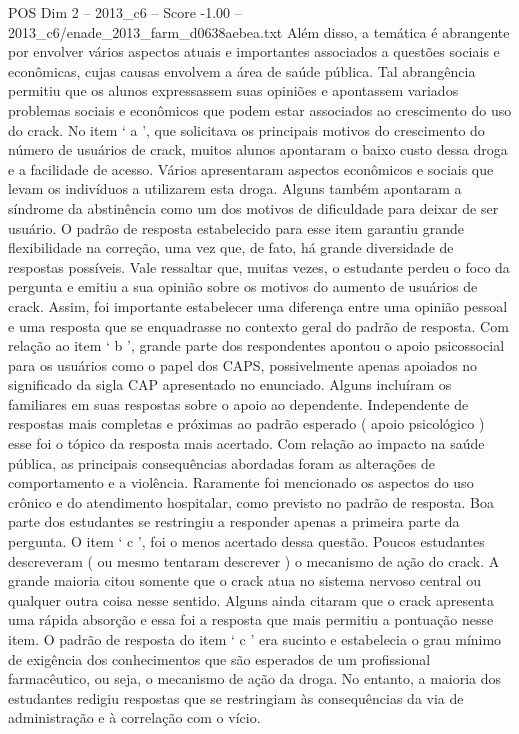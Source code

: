 \begin{textsample}{POS Dim 2 – 2013\_c6 – Score -1.00 – 2013\_c6/enade\_2013\_farm\_d0638aebea.txt}
Além disso, a temática é abrangente por envolver vários aspectos atuais e importantes associados a questões sociais e econômicas, cujas causas envolvem a área de saúde pública.
Tal abrangência permitiu que os alunos expressassem suas opiniões e apontassem variados problemas sociais e econômicos que podem estar associados ao crescimento do uso do crack.
No item ‘ a ’, que solicitava os principais motivos do crescimento do número de usuários de crack, muitos alunos apontaram o baixo custo dessa droga e a facilidade de acesso.
Vários apresentaram aspectos econômicos e sociais que levam os indivíduos a utilizarem esta droga.
Alguns também apontaram a síndrome da abstinência como um dos motivos de dificuldade para deixar de ser usuário.
O padrão de resposta estabelecido para esse item garantiu grande flexibilidade na correção, uma vez que, de fato, há grande diversidade de respostas possíveis.
Vale ressaltar que, muitas vezes, o estudante perdeu o foco da pergunta e emitiu a sua opinião sobre os motivos do aumento de usuários de crack.
Assim, foi importante estabelecer uma diferença entre uma opinião pessoal e uma resposta que se enquadrasse no contexto geral do padrão de resposta.
Com relação ao item ‘ b ’, grande parte dos respondentes apontou o apoio psicossocial para os usuários como o papel dos CAPS, possivelmente apenas apoiados no significado da sigla CAP apresentado no enunciado.
Alguns incluíram os familiares em suas respostas sobre o apoio ao dependente.
Independente de respostas mais completas e próximas ao padrão esperado ( apoio psicológico ) esse foi o tópico da resposta mais acertado.
Com relação ao impacto na saúde pública, as principais consequências abordadas foram as alterações de comportamento e a violência.
Raramente foi mencionado os aspectos do uso crônico e do atendimento hospitalar, como previsto no padrão de resposta.
Boa parte dos estudantes se restringiu a responder apenas a primeira parte da pergunta.
O item ‘ c ’, foi o menos acertado dessa questão.
Poucos estudantes descreveram ( ou mesmo tentaram descrever ) o mecanismo de ação do crack.
A grande maioria citou somente que o crack atua no sistema nervoso central ou qualquer outra coisa nesse sentido.
Alguns ainda citaram que o crack apresenta uma rápida absorção e essa foi a resposta que mais permitiu a pontuação nesse item.
O padrão de resposta do item ‘ c ’ era sucinto e estabelecia o grau mínimo de exigência dos conhecimentos que são esperados de um profissional farmacêutico, ou seja, o mecanismo de ação da droga.
No entanto, a maioria dos estudantes redigiu respostas que se restringiam às consequências da via de administração e à correlação com o vício.

\end{textsample}
